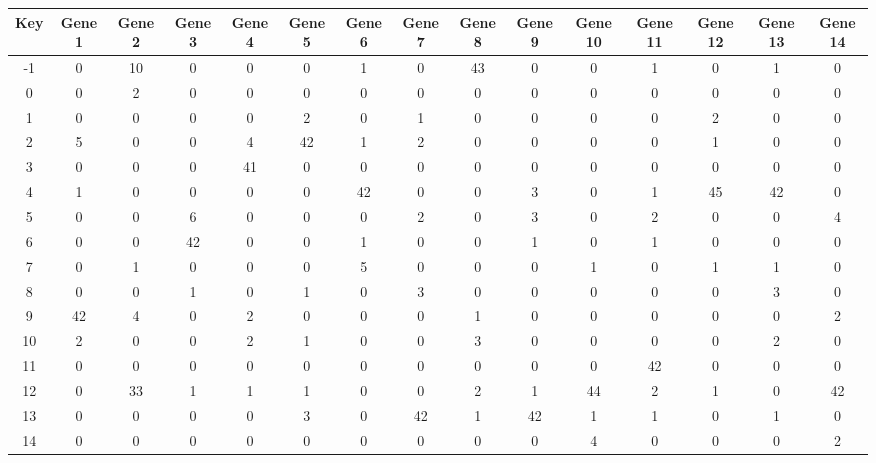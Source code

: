 \begin{tabular}{|c|c|c|c|c|c|c|c|c|c|c|c|c|c|c|}
\hline
Key & Gene 1 & Gene 2 & Gene 3 & Gene 4 & Gene 5 & Gene 6 & Gene 7 & Gene 8 & Gene 9 & Gene 10 & Gene 11 & Gene 12 & Gene 13 & Gene 14 \\
\hline
-1 & 0 & 10 & 0 & 0 & 0 & 1 & 0 & 43 & 0 & 0 & 1 & 0 & 1 & 0 \\
0 & 0 & 2 & 0 & 0 & 0 & 0 & 0 & 0 & 0 & 0 & 0 & 0 & 0 & 0 \\
1 & 0 & 0 & 0 & 0 & 2 & 0 & 1 & 0 & 0 & 0 & 0 & 2 & 0 & 0 \\
2 & 5 & 0 & 0 & 4 & 42 & 1 & 2 & 0 & 0 & 0 & 0 & 1 & 0 & 0 \\
3 & 0 & 0 & 0 & 41 & 0 & 0 & 0 & 0 & 0 & 0 & 0 & 0 & 0 & 0 \\
4 & 1 & 0 & 0 & 0 & 0 & 42 & 0 & 0 & 3 & 0 & 1 & 45 & 42 & 0 \\
5 & 0 & 0 & 6 & 0 & 0 & 0 & 2 & 0 & 3 & 0 & 2 & 0 & 0 & 4 \\
6 & 0 & 0 & 42 & 0 & 0 & 1 & 0 & 0 & 1 & 0 & 1 & 0 & 0 & 0 \\
7 & 0 & 1 & 0 & 0 & 0 & 5 & 0 & 0 & 0 & 1 & 0 & 1 & 1 & 0 \\
8 & 0 & 0 & 1 & 0 & 1 & 0 & 3 & 0 & 0 & 0 & 0 & 0 & 3 & 0 \\
9 & 42 & 4 & 0 & 2 & 0 & 0 & 0 & 1 & 0 & 0 & 0 & 0 & 0 & 2 \\
10 & 2 & 0 & 0 & 2 & 1 & 0 & 0 & 3 & 0 & 0 & 0 & 0 & 2 & 0 \\
11 & 0 & 0 & 0 & 0 & 0 & 0 & 0 & 0 & 0 & 0 & 42 & 0 & 0 & 0 \\
12 & 0 & 33 & 1 & 1 & 1 & 0 & 0 & 2 & 1 & 44 & 2 & 1 & 0 & 42 \\
13 & 0 & 0 & 0 & 0 & 3 & 0 & 42 & 1 & 42 & 1 & 1 & 0 & 1 & 0 \\
14 & 0 & 0 & 0 & 0 & 0 & 0 & 0 & 0 & 0 & 4 & 0 & 0 & 0 & 2 \\
\hline
\end{tabular}